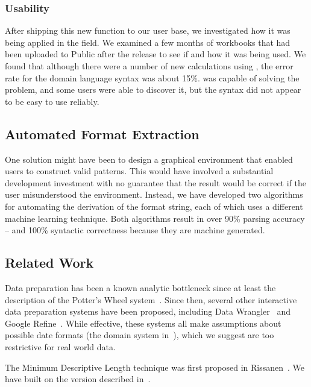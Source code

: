 \subsubsection{	Usability}
After shipping this new function to our user base, we investigated how it was being applied in the field. We examined a few months of workbooks that had been uploaded to Public after the release to see if and how it was being used. We found that although there were a number of new calculations using \dateparse, the error rate for the domain language syntax was about 15\%. \dateparse was capable of solving the problem, and some users were able to discover it, but the syntax did not appear to be easy to use reliably.

\subsection{Automated Format Extraction}
One solution might have been to design a graphical environment that enabled users to construct valid patterns. This would have involved a substantial development investment with no guarantee that the result would be correct if the user misunderstood the environment. Instead, we have developed two algorithms for automating the derivation of the format string, each of which uses a different machine learning technique. Both algorithms result in over 90\% parsing accuracy -- and 100\% syntactic correctness because they are machine generated.


\subsection{Related Work}

Data preparation has been a known analytic bottleneck since at least the description of the Potter's Wheel system~\cite{Ramen:2001}. Since then, several other interactive data preparation systems have been proposed, including Data Wrangler~\cite{Kandel:2001} and Google Refine~\cite{refine}. While effective, these systems all make assumptions about possible date formats (\eg the domain system in~\cite{Ramen:2001}), which we suggest are too restrictive for real world data.

The Minimum Descriptive Length technique was first proposed in Rissanen~\cite{Rissanen:1978}.  We have built on the version described in~\cite{Ramen:2001}.

